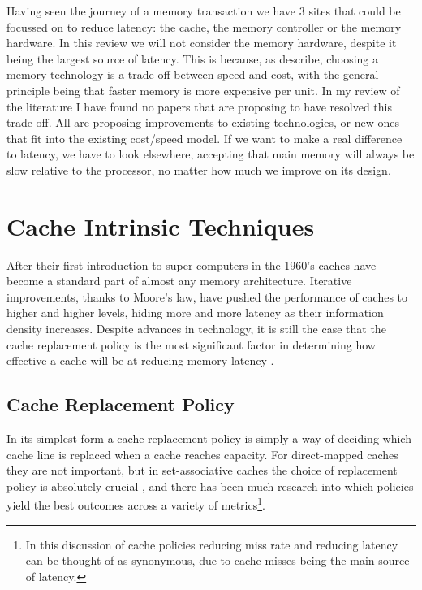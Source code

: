 Having seen the journey of a memory transaction we have 3 sites that could be focussed on to reduce latency: the cache, the memory controller or the memory hardware. In this review we will not consider the memory hardware, despite it being the largest source of latency. This is because, as \citet{pattersonComputerOrganizationDesign2018} describe, choosing a memory technology is a trade-off between speed and cost, with the general principle being that faster memory is more expensive per unit. In my review of the literature I have found no papers that are proposing to have resolved this trade-off. All are proposing improvements to existing technologies, or new ones that fit into the existing cost/speed model. If we want to make a real difference to latency, we have to look elsewhere, accepting that main memory will always be slow relative to the processor, no matter how much we improve on its design.

\section{Cache Intrinsic Techniques}

\label{sec:cache}

After their first introduction to super-computers in the 1960's \cite{pattersonComputerOrganizationDesign2018} caches have become a standard part of almost any memory architecture. Iterative improvements, thanks to Moore's law, have pushed the performance of caches to higher and higher levels, hiding more and more latency as their information density increases. Despite advances in technology, it is still the case that the cache replacement policy is the most significant factor in determining how effective a cache will be at reducing memory latency \cite{hennessyComputerArchitectureQuantitative2019}.

\subsection{Cache Replacement Policy}
\label{sec:replacement_policy}

In its simplest form a cache replacement policy is simply a way of deciding which cache line is replaced when a cache reaches capacity. For direct-mapped caches they are not important, but in set-associative caches the choice of replacement policy is absolutely crucial \cite{hennessyComputerArchitectureQuantitative2019}, and there has been much research into which policies yield the best outcomes across a variety of metrics\footnote{In this discussion of cache policies reducing miss rate and reducing latency can be thought of as synonymous, due to cache misses being the main source of latency.}.

